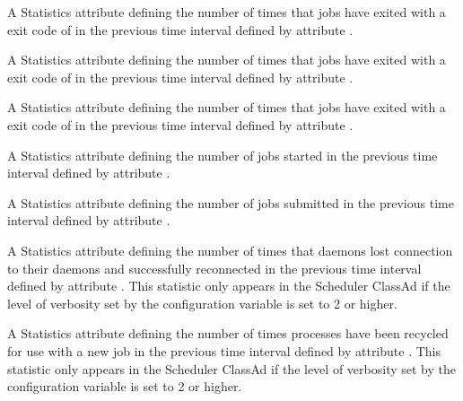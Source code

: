 \begin{description}
\item[\AdAttr{RecentJobsShouldHold}:] A Statistics attribute defining
  the number of times that jobs
  have exited with a  exit code of 
  in the previous time interval defined by attribute .

\item[\AdAttr{RecentJobsShouldRemove}:] A Statistics attribute defining
  the number of times that jobs 
  have exited with a  exit code of 
  in the previous time interval defined by attribute .

\item[\AdAttr{RecentJobsShouldRequeue}:] A Statistics attribute defining
  the number of times that jobs 
  have exited with a  exit code of 
  in the previous time interval defined by attribute .

\item[\AdAttr{RecentJobsStarted}:] A Statistics attribute defining
  the number of jobs started
  in the previous time interval defined by attribute .

\item[\AdAttr{RecentJobsSubmitted}:] A Statistics attribute defining
  the number of jobs submitted
  in the previous time interval defined by attribute .

\item[\AdAttr{RecentShadowsReconnections}:] A Statistics attribute defining
  the number of times that   daemons lost 
  connection to their  daemons and successfully reconnected
  in the previous time interval defined by attribute .
  This statistic only appears in the Scheduler ClassAd if the level of
  verbosity set by the configuration variable 
  is set to 2 or higher.
  
\item[\AdAttr{RecentShadowsRecycled}:] A Statistics attribute defining
  the number of times  
  processes have been recycled for use with a new job
  in the previous time interval defined by attribute .
  This statistic only appears in the Scheduler ClassAd if the level of
  verbosity set by the configuration variable 
  is set to 2 or higher.


\end{description}
